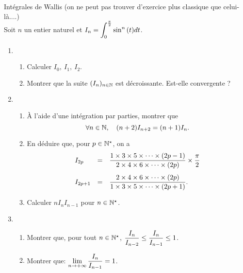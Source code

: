 \documentclass[a4paper, 11pt,reqno]{article}
\begin{document}
\begin{exercice}  \; Int\'egrales de Wallis (on ne peut pas trouver d'exercice plus classique que celui-l\`a....)\\

	\noindent Soit $n$ un entier naturel et $\displaystyle I_n=\int_0^{\frac{\pi}{2}} \sin^n{(t)}dt$.
	\begin{enumerate}
		\item
		      \begin{enumerate}
			      \item Calculer $I_0,\ I_1,\ I_2$.
			      \item Montrer que la suite $(I_n)_{n\in\mathbb{N}}$ est d\'ecroissante. Est-elle convergente ?
		      \end{enumerate}
		\item
		      \begin{enumerate}
			      \item \`{A} l'aide d'une int\'egration par parties, montrer que
			            $$\forall n\in\mathbb{N},\quad (n+2)I_{n+2}=(n+1)I_n.$$
			      \item En d\'eduire que, pour $p\in\mathbb{N}^{\star}$, on a
			            $$\begin{array}{lll}
					            I_{2p}   & = & \ddp\frac{1\times 3\times 5\times \dots\times (2p-1)}{2\times 4\times 6\times\dots\times (2p)}\times \ddp\frac{\pi}{2}\vsec \\
					            I_{2p+1} & = & \ddp\frac{2\times 4\times 6\times \dots\times (2p)}{1\times 3\times 5\times\dots\times (2p+1)}.
				            \end{array}$$
			      \item Calculer $nI_nI_{n-1}$ pour $n\in\mathbb{N}^{\star}$.
		      \end{enumerate}
		\item
		      \begin{enumerate}
			      \item Montrer que, pour tout $n\in\mathbb{N}^{\star}$, $\displaystyle\frac{I_n}{I_{n-2}} \leq \displaystyle\frac{I_n}{I_{n-1}}\leq 1 $.
			      \item Montrer que: $\lim\limits_{n\to +\infty} \displaystyle\frac{I_n}{I_{n-1}}=1$. %
		      \end{enumerate}
	\end{enumerate}
\end{exercice}
\end{document}
